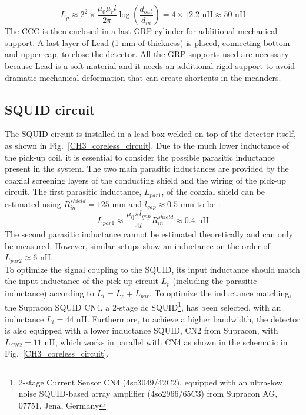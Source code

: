 \documentclass[12pt,a4paper]{report}
\begin{document}
       \begin{equation}
       	L_p\approx 2^2 \times \frac{\mu_0\mu_rl}{2\pi}\log\left(\frac{d_{out}}{d_{in}}\right) = 4\times 12.2 \text{ nH} \approx 50 \text{ nH}
       \end{equation}
       The CCC is then enclosed in a last GRP cylinder for additional mechanical support. A last layer of Lead (1 mm of thickness) is placed, connecting bottom and upper cap, to close the detector. All the GRP supports used are necessary because Lead is a soft material and it needs an additional rigid support to avoid dramatic mechanical deformation that can create shortcuts in the meanders. \\
       \subsection{SQUID circuit}
       The SQUID circuit is installed in a lead box welded on top of the detector itself, as shown in Fig.~\ref{CH3_coreless_circuit}. Due to the much lower inductance of the pick-up coil, it is essential to consider the possible parasitic inductance present in the system. The two main parasitic inductances are provided by the coaxial screening layers of the conducting shield and the wiring of the pick-up circuit. The first parasitic inductance, $L_{par1}$, of the coaxial shield can be estimated using $R_{in}^{shield} = 125$ mm and $l_{gap} \approx 0.5$ mm to be \cite{CorelessCCC}:
       \begin{equation}
       	L_{par1} \approx \frac{\mu_0 \pi l_{gap}}{4 l} R_{in}^{shield} \approx 0.4 \text{ nH}
       \end{equation}
       The second parasitic inductance cannot be estimated theoretically and can only be measured. However, similar setups show an inductance on the order of $L_{par2} \approx 6$ nH.\\
       To optimize the signal coupling to the SQUID, its input inductance should match the input inductance of the pick-up circuit $L_p$ (including the parasitic inductance) according to $L_i = L_p + L_{par}$. To optimize the inductance matching, the Supracon SQUID CN4, a 2-stage dc SQUID\footnote{2-stage Current Sensor CN4 (4so3049/42C2), equipped with an ultra-low noise SQUID-based array amplifier (4so2966/65C3) from Supracon AG, 07751, Jena, Germany}, has been selected, with an inductance $L_i = 44$ nH. Furthermore, to achieve a higher bandwidth, the detector is also equipped with a lower inductance SQUID, CN2 from Supracon, with $L_{CN2} = 11$ nH, which works in parallel with CN4 as shown in the schematic in Fig.~\ref{CH3_coreless_circuit}.
\end{document}
